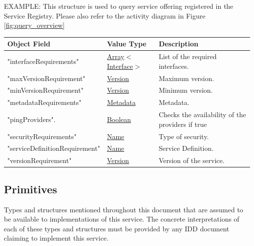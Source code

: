 \documentclass[a4paper]{arrowhead}
\newcommand{\pref}[1]{{\textcolor{ArrowheadGrey}{\hyperref[sec:model:primitives:#1]{#1}}}}
\begin{document}

\color{red} 
EXAMPLE: This structure is used to query service offering registered in
the Service Registry. Please also refer to the activity diagram in
Figure \ref{fig:query_overview} \color{black}

\begin{table}[ht!]
\begin{tabularx}{\textwidth}{| p{5cm} | p{3.5cm} | X |} \hline
\rowcolor{gray!33} Object Field & Value Type      & Description \\ \hline
"interfaceRequirements"                   & \pref{Array}$<$\pref{Interface}$>$     & List of the required interfaces. \\ \hline
"maxVersionRequirement"                & \pref{Version}     & Maximum version. \\ \hline
"minVersionRequirement"                & \pref{Version}     & Minimum version. \\ \hline
"metadataRequirements"                  & \pref{Metadata}     & Metadata. \\ \hline
"pingProviders".                    & \pref{Boolean} & Checks the availability of the providers if true \\ \hline
"securityRequirements"                    &\pref{Name}  & Type of security. \\ \hline
"serviceDefinitionRequirement"         &\pref{Name}        & Service Definition. \\ \hline
"versionRequirement"                   &\pref{Version}     & Version of the service. \\ \hline
\end{tabularx}
\end{table}


\subsection{Primitives}
\label{sec:model:primitives}

Types and structures mentioned throughout this document that are assumed to be available to implementations of this service.
The concrete interpretations of each of these types and structures must be provided by any IDD document claiming to implement this service.
\end{document}
